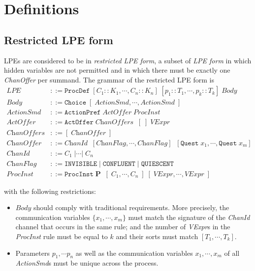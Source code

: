 \chapter{Definitions}

\section{Restricted LPE form} \label{restricted-lpe}

LPEs are considered to be in \emph{restricted LPE form}, a subset of \emph{LPE form} in which hidden variables are not permitted and in which there must be exactly one \textit{ChanOffer} per summand.
The grammar of the restricted LPE form is
\begin{align*}
\textit{LPE} &::= \texttt{ProcDef} \; [C_1 :: K_1, \cdots{}, C_n :: K_n] \; [p_1 :: T_1, \cdots{}, p_k :: T_k] \; \textit{Body} \\
\textit{Body} &::= \texttt{Choice} \; [ \;\! \textit{ActionSmd}, \cdots{}, \textit{ActionSmd} \; ] \\
\textit{ActionSmd} &::= \texttt{ActionPref} \; \textit{ActOffer} \; \textit{ProcInst} \\
\textit{ActOffer} &::= \texttt{ActOffer} \; \textit{ChanOffers} \;\; [\;] \; \textit{VExpr} \\
\textit{ChanOffers} &::= [ \;\! \textit{ChanOffer} \; ] \\
\textit{ChanOffer} &::= \textit{ChanId} \;\; [\textit{ChanFlag}, \cdots{}, \textit{ChanFlag}] \;\; [\texttt{Quest} \; x_1, \cdots{}, \texttt{Quest} \; x_m] \\
\textit{ChanId} &::= C_1 \;| \cdots{} |\; C_n \\
\textit{ChanFlag} &::= \texttt{INVISIBLE} \;|\; \texttt{CONFLUENT} \;|\; \texttt{QUIESCENT} \\
\textit{ProcInst} &::= \texttt{ProcInst} \; \mathbf{P} \; \; [ \; C_1, \cdots{}, C_n \; ] \; [\;\!\textit{VExpr}, \cdots{}, \textit{VExpr} \; ]
\end{align*}

with the following restrictions:
\begin{itemize}
\item $\textit{Body}$ should comply with traditional \txs{} requirements.
More precisely, the communication variables $\{ x_1, \cdots{}, x_m \}$ must match the signature of the \textit{ChanId} channel that occurs in the same rule; and the number of \textit{VExpr}s in the \textit{ProcInst} rule must be equal to $k$ and their sorts must match $[T_1, \cdots{}, T_k]$.
\item Parameters $p_1\comma \cdots{} p_n$ as well as the communication variables $x_1\comma \cdots{}\comma x_m$ of all \textit{ActionSmd}s must be unique across the process.
\end{itemize}

